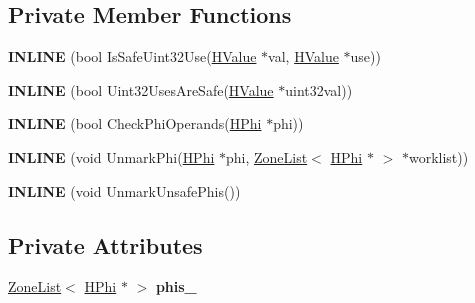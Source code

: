 \subsection*{Private Member Functions}
\begin{DoxyCompactItemize}
\item 
{\bfseries I\+N\+L\+I\+NE} (bool Is\+Safe\+Uint32\+Use(\hyperlink{classv8_1_1internal_1_1_h_value}{H\+Value} $\ast$val, \hyperlink{classv8_1_1internal_1_1_h_value}{H\+Value} $\ast$use))\hypertarget{classv8_1_1internal_1_1_h_uint32_analysis_phase_af42da71132840a0685c314a8c5101bc5}{}\label{classv8_1_1internal_1_1_h_uint32_analysis_phase_af42da71132840a0685c314a8c5101bc5}

\item 
{\bfseries I\+N\+L\+I\+NE} (bool Uint32\+Uses\+Are\+Safe(\hyperlink{classv8_1_1internal_1_1_h_value}{H\+Value} $\ast$uint32val))\hypertarget{classv8_1_1internal_1_1_h_uint32_analysis_phase_a2f4dee2201cf0c65498c8c1eedc6b0ca}{}\label{classv8_1_1internal_1_1_h_uint32_analysis_phase_a2f4dee2201cf0c65498c8c1eedc6b0ca}

\item 
{\bfseries I\+N\+L\+I\+NE} (bool Check\+Phi\+Operands(\hyperlink{classv8_1_1internal_1_1_h_phi}{H\+Phi} $\ast$phi))\hypertarget{classv8_1_1internal_1_1_h_uint32_analysis_phase_acc9bc21f5e5d1f3acb3e2f6153f14abf}{}\label{classv8_1_1internal_1_1_h_uint32_analysis_phase_acc9bc21f5e5d1f3acb3e2f6153f14abf}

\item 
{\bfseries I\+N\+L\+I\+NE} (void Unmark\+Phi(\hyperlink{classv8_1_1internal_1_1_h_phi}{H\+Phi} $\ast$phi, \hyperlink{classv8_1_1internal_1_1_zone_list}{Zone\+List}$<$ \hyperlink{classv8_1_1internal_1_1_h_phi}{H\+Phi} $\ast$ $>$ $\ast$worklist))\hypertarget{classv8_1_1internal_1_1_h_uint32_analysis_phase_ae3b2e3d5790511491948c2d2445246ab}{}\label{classv8_1_1internal_1_1_h_uint32_analysis_phase_ae3b2e3d5790511491948c2d2445246ab}

\item 
{\bfseries I\+N\+L\+I\+NE} (void Unmark\+Unsafe\+Phis())\hypertarget{classv8_1_1internal_1_1_h_uint32_analysis_phase_ab7f9059b196266b707fd9c48e7276e1e}{}\label{classv8_1_1internal_1_1_h_uint32_analysis_phase_ab7f9059b196266b707fd9c48e7276e1e}

\end{DoxyCompactItemize}
\subsection*{Private Attributes}
\begin{DoxyCompactItemize}
\item 
\hyperlink{classv8_1_1internal_1_1_zone_list}{Zone\+List}$<$ \hyperlink{classv8_1_1internal_1_1_h_phi}{H\+Phi} $\ast$ $>$ {\bfseries phis\+\_\+}\hypertarget{classv8_1_1internal_1_1_h_uint32_analysis_phase_a9f6b1eb4e0c58a6561488bff8d527b80}{}\label{classv8_1_1internal_1_1_h_uint32_analysis_phase_a9f6b1eb4e0c58a6561488bff8d527b80}

\end{DoxyCompactItemize}

